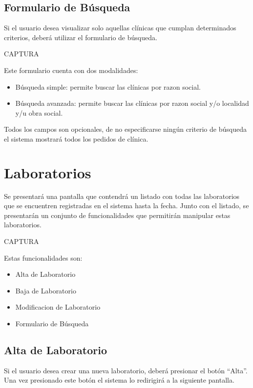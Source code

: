 \documentclass[letterpaper,10pt,spanish]{sphinxmanual}
\begin{document}
\subsection{Formulario de Búsqueda}
\label{clinicas:formulario-de-busqueda}
Si el usuario desea visualizar solo aquellas clínicas que cumplan determinados criterios, deberá utilizar el formulario de búsqueda.

CAPTURA

Este formulario cuenta con dos modalidades:
\begin{itemize}
\item {} 
Búsqueda simple: permite buscar las clínicas por razon social.

\item {} 
Búsqueda avanzada: permite buscar las clínicas por razon social y/o localidad y/u obra social.

\end{itemize}

Todos los campos son opcionales, de no especificarse ningún criterio de búsqueda el sistema mostrará todos los pedidos de clínica.


\section{Laboratorios}
\label{laboratorios::doc}\label{laboratorios:laboratorios}
Se presentará una pantalla que contendrá un listado con todas las laboratorios que se encuentren registradas en el sistema hasta la fecha. Junto con el listado, se presentarán un conjunto de funcionalidades que permitirán manipular estas laboratorios.

CAPTURA

Estas funcionalidades son:
\begin{itemize}
\item {} 
Alta de Laboratorio

\item {} 
Baja de Laboratorio

\item {} 
Modificacion de Laboratorio

\item {} 
Formulario de Búsqueda

\end{itemize}


\subsection{Alta de Laboratorio}
\label{laboratorios:alta-de-laboratorio}
Si el usuario desea crear una nueva laboratorio, deberá presionar el botón “Alta”. Una vez presionado este botón el sistema lo redirigirá a la siguiente pantalla.
\end{document}
